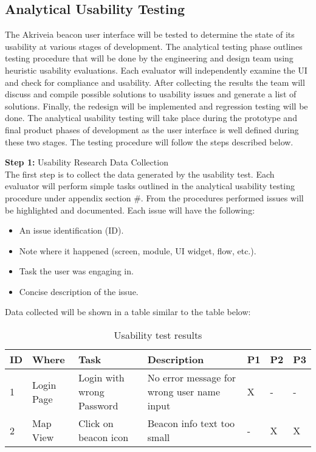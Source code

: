 

\subsection{Analytical Usability Testing}
\bigskip
The Akriveia beacon user interface will be tested to determine the state of its usability at various stages of development. The analytical testing phase outlines testing procedure that will be done by the engineering and design team using heuristic usability evaluations. Each evaluator will independently examine the UI and check for compliance and usability. After collecting the results the team will discuss and compile possible solutions to usability issues and generate a list of solutions. Finally, the redesign will be implemented and regression testing will be done. The analytical usability testing will take place during the prototype and final product phases of development as the user interface is well defined during these two stages. The testing procedure will follow the steps described below.

\bigskip



\textbf{Step 1:} Usability Research Data Collection\\
\medskip
The first step is to collect the data generated by the usability test. Each evaluator will perform simple tasks outlined in the analytical usability testing procedure under appendix section \#. From the procedures performed issues will be highlighted and documented. Each issue will have the following:
\begin{itemize}
\setlength\itemsep{0.1mm}
	\item An issue identification (ID).
	\item Note where it happened (screen, module, UI widget, flow, etc.).
	\item Task the user was engaging in.
	\item Concise description of the issue.
\end{itemize}
Data collected will be shown in a table similar to the table below:

\def\arraystretch{1.5}
\begin{table}[H]
\centering
\begin{tabular}{ | p{0.5cm} | p{2cm}| p{5cm} | p{5cm} | p{0.5cm} | p{0.5cm} | p{0.5cm}|} 
\hline 
ID & Where & Task & Description & P1 & P2 & P3 \\
\hline
1 & Login Page & Login with wrong Password & No error message for wrong user name input & X & - & - \\
\hline
2 & Map View & Click on beacon icon & Beacon info text too small & - & X & X \\
\hline
\end{tabular}
\caption{Usability test results}
\end{table}	



